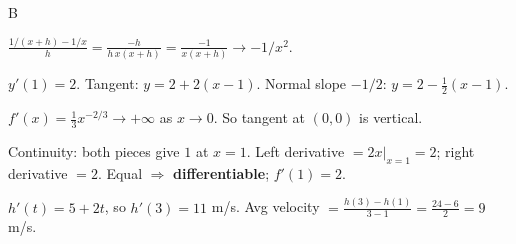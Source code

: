 \documentclass[11pt]{article}
\begin{document}
\begin{answers}{B}
\item $\tfrac{1/(x+h) - 1/x}{h} = \tfrac{-h}{h\, x(x+h)} = \tfrac{-1}{x(x+h)} \to \boxed{-1/x^2}$.
\item $y'(1) = 2$. Tangent: $y = 2 + 2(x-1)$. Normal slope $-1/2$: $y = 2 - \tfrac{1}{2}(x-1)$.
\item $f'(x) = \tfrac{1}{3} x^{-2/3} \to +\infty$ as $x \to 0$. So tangent at $(0,0)$ is vertical.
\item Continuity: both pieces give $1$ at $x=1$. Left derivative $=2x|_{x=1} = 2$; right derivative $=2$. Equal $\Rightarrow$ \textbf{differentiable}; $f'(1) = 2$.
\item $h'(t) = 5 + 2t$, so $h'(3) = \boxed{11}$ m/s. Avg velocity $= \tfrac{h(3)-h(1)}{3-1} = \tfrac{24 - 6}{2} = \boxed{9}$ m/s.
\end{answers}
\end{document}
